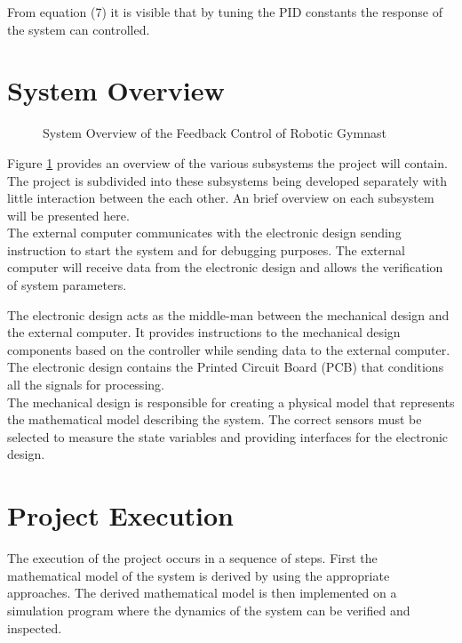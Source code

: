 \documentclass[a4paper,12pt]{article}
\begin{document}
 	From equation (7) it is visible that by tuning the PID constants the response of the system can controlled.
 	
 	
 	\section{System Overview}
 	\begin{figure}[h]
 		\centering
 		
 		\caption{System Overview of the Feedback Control of Robotic Gymnast}
 		\label{fig:system_overview}
 	\end{figure}
 	
 	
 	Figure \ref{fig:system_overview} provides an overview of the various subsystems the project will contain. The project is subdivided into these subsystems being developed separately with little interaction between the each other. An brief overview on each subsystem will be presented here.\\
 	
 	The external computer communicates with the electronic design sending instruction to start the system and for debugging purposes. The external computer will receive data from the electronic design and allows the verification of system parameters.
 	
 	The electronic design acts as the middle-man between the mechanical design and the external computer. It provides instructions to the mechanical design components based on the controller while sending data to the external computer. The electronic design contains the Printed Circuit Board (PCB) that conditions all the signals for processing.\\
 	
 	The mechanical design is responsible for creating a physical model that represents the mathematical model describing the system. The correct sensors must be selected to measure the state variables and providing interfaces for the electronic design.
  	
  	\section{Project Execution}
 	
 	The execution of the project occurs in a sequence of steps. First the mathematical model of the system is derived by using the appropriate approaches. The derived mathematical model is then implemented on a simulation program where the dynamics of the system can be verified and inspected.\\
 		
\end{document}
